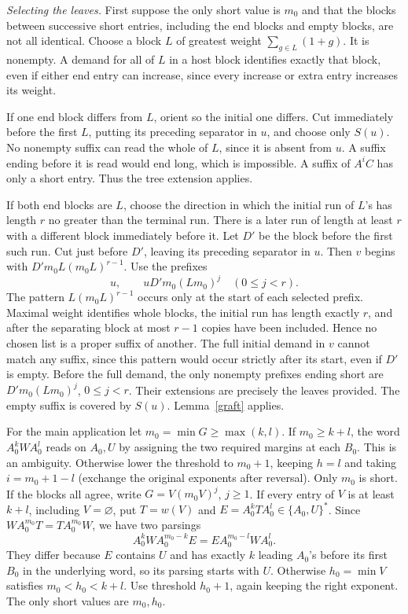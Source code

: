 \documentclass[11pt,a4paper]{article}
\newcommand{\parhead}[1]{\par\smallskip\noindent\textit{#1.}\enspace}
\begin{document}
\parhead{Selecting the leaves}
First suppose the only short value is $m_0$ and that the blocks between successive short entries, including the end blocks and empty blocks, are not all identical. Choose a block $L$ of greatest weight $\sum_{g\in L}(1+g)$. It is nonempty. A demand for all of $L$ in a host block identifies exactly that block, even if either end entry can increase, since every increase or extra entry increases its weight.

If one end block differs from $L$, orient so the initial one differs. Cut immediately before the first $L$, putting its preceding separator in $u$, and choose only $S(u)$. No nonempty suffix can read the whole of $L$, since it is absent from $u$. A suffix ending before it is read would end long, which is impossible. A suffix of $A^i C$ has only a short entry. Thus the tree extension applies.

If both end blocks are $L$, choose the direction in which the initial run of $L$'s has length $r$ no greater than the terminal run. There is a later run of length at least $r$ with a different block immediately before it. Let $D'$ be the block before the first such run. Cut just before $D'$, leaving its preceding separator in $u$. Then $v$ begins with $D'm_0 L(m_0 L)^{r-1}$. Use the prefixes
\[
                   u,\qquad uD'm_0(Lm_0)^j\quad(0\le j<r).
\]
The pattern $L(m_0 L)^{r-1}$ occurs only at the start of each selected prefix. Maximal weight identifies whole blocks, the initial run has length exactly $r$, and after the separating block at most $r-1$ copies have been included. Hence no chosen list is a proper suffix of another. The full initial demand in $v$ cannot match any suffix, since this pattern would occur strictly after its start, even if $D'$ is empty. Before the full demand, the only nonempty prefixes ending short are $D'm_0(Lm_0)^j$, $0\le j<r$. Their extensions are precisely the leaves provided. The empty suffix is covered by $S(u)$. Lemma~\ref{graft} applies.

For the main application let $m_0=\min G\ge\max(k,l)$. If $m_0\ge k+l$, the word $A_0^k W A_0^l$ reads on $A_0,U$ by assigning the two required margins at each $B_0$. This is an ambiguity. Otherwise lower the threshold to $m_0+1$, keeping $h=l$ and taking $i=m_0+1-l$ (exchange the original exponents after reversal). Only $m_0$ is short. If the blocks all agree, write $G=V(m_0 V)^j$, $j\ge1$. If every entry of $V$ is at least $k+l$, including $V=\varnothing$, put $T=w(V)$ and $E=A_0^k T A_0^l\in\{A_0,U\}^*$. Since $W A_0^{m_0}T=T A_0^{m_0}W$, we have two parsings
\[
 A_0^k W A_0^{m_0-k}E=E A_0^{m_0-l}W A_0^l .
\]
They differ because $E$ contains $U$ and has exactly $k$ leading $A_0$'s before its first $B_0$ in the underlying word, so its parsing starts with $U$. Otherwise $h_0=\min V$ satisfies $m_0<h_0<k+l$. Use threshold $h_0+1$, again keeping the right exponent. The only short values are $m_0,h_0$.
\end{document}
